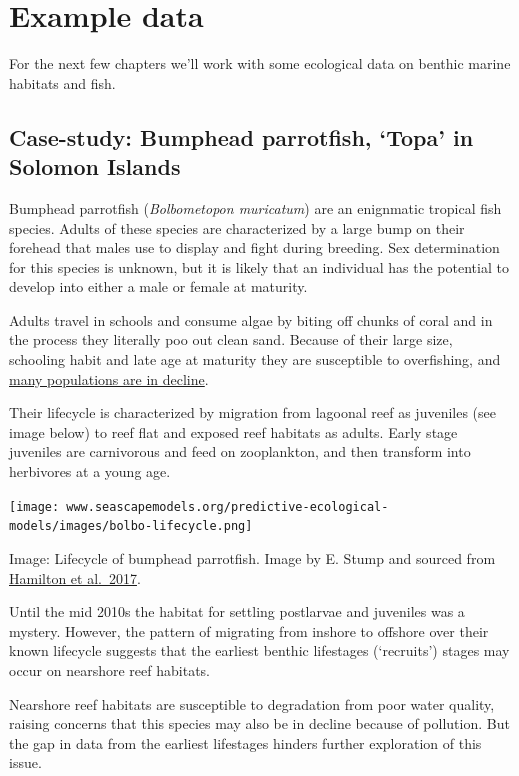 \documentclass[
  letterpaper,
  DIV=11,
  numbers=noendperiod]{scrreprt}
\begin{document}
\section{Example data}\label{example-data}

For the next few chapters we'll work with some ecological data on
benthic marine habitats and fish.

\subsection{Case-study: Bumphead parrotfish, `Topa' in Solomon
Islands}\label{case-study-bumphead-parrotfish-topa-in-solomon-islands}

Bumphead parrotfish (\emph{Bolbometopon muricatum}) are an enignmatic
tropical fish species. Adults of these species are characterized by a
large bump on their forehead that males use to display and fight during
breeding. Sex determination for this species is unknown, but it is
likely that an individual has the potential to develop into either a
male or female at maturity.

Adults travel in schools and consume algae by biting off chunks of coral
and in the process they literally poo out clean sand. Because of their
large size, schooling habit and late age at maturity they are
susceptible to overfishing, and
\href{https://doi.org/10.1007/s00338-019-01801-z}{many populations are
in decline}.

Their lifecycle is characterized by migration from lagoonal reef as
juveniles (see image below) to reef flat and exposed reef habitats as
adults. Early stage juveniles are carnivorous and feed on zooplankton,
and then transform into herbivores at a young age.

\texttt{[image: www.seascapemodels.org/predictive-ecological-models/images/bolbo-lifecycle.png]}

Image: Lifecycle of bumphead parrotfish. Image by E. Stump and sourced
from \href{http://dx.doi.org/10.1016/j.biocon.2017.04.024}{Hamilton et
al.~2017}.

Until the mid 2010s the habitat for settling postlarvae and juveniles
was a mystery. However, the pattern of migrating from inshore to
offshore over their known lifecycle suggests that the earliest benthic
lifestages (`recruits') stages may occur on nearshore reef habitats.

Nearshore reef habitats are susceptible to degradation from poor water
quality, raising concerns that this species may also be in decline
because of pollution. But the gap in data from the earliest lifestages
hinders further exploration of this issue.
\end{document}
